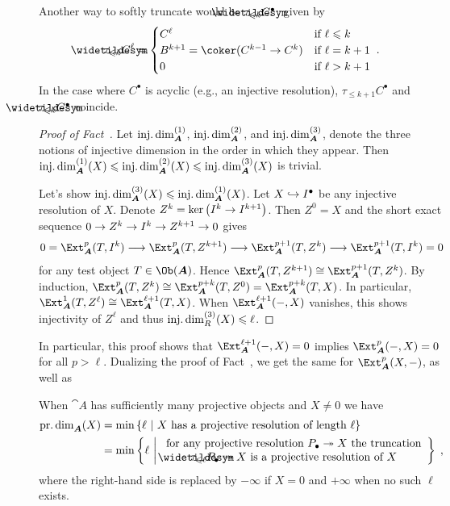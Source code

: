 \documentclass[a4paper,parskip=half,numbers=enddot, DIV=12]{scrreprt}
\renewcommand{\leq}{\leqslant}
\begin{document}
Another way to softly truncate would be $\snake{\tau}_{\leq k}C^\bullet$, given by
\begin{align*}
\snake{\tau}_{\leq k}C^\ell=\begin{cases}
C^\ell & \text{if }\ell\leq k\\
B^{k+1}=\coker(C^{k-1}\morphism C^k) & \text{if }\ell=k+1\\
0 & \text{if }\ell>k+1
\end{cases}\;.
\end{align*}
In the case where $C^\bullet$ is acyclic (e.g., an injective resolution), $\tau_{\leq k+1}C^\bullet$ and $\snake{\tau}_{\leq k}C^\bullet$ coincide.
\begin{proof}[Proof of Fact~]
	Let $\idim_{\cat A}^{(1)}$, $\idim_{\cat A}^{(2)}$, and $\idim_{\cat A}^{(3)}$,  denote the three notions of injective dimension in the order in which they appear. Then $\idim_{\cat A}^{(1)}(X)\leq \idim_{\cat A}^{(2)}(X)\leq \idim_{\cat A}^{(3)}(X)$ is trivial.
	
	Let's show $\idim_{\cat A}^{(3)}(X)\leq \idim_{\cat A}^{(1)}(X)$. Let $X\monomorphism I^\bullet$ be any injective resolution of $X$. Denote $Z^k=\ker\left(I^k\morphism I^{k+1}\right)$. Then $Z^0=X$ and the short exact sequence $0\morphism Z^k\morphism I^k\morphism Z^{k+1}\morphism 0$ gives
	\begin{align*}
		0=\Ext_{\cat A}^p(T,I^k)\morphism \Ext_{\cat A}^p(T,Z^{k+1})\morphism\Ext_{\cat A}^{p+1}(T,Z^k)\morphism\Ext_{\cat A}^{p+1}(T,I^k)=0
	\end{align*}
	for any test object $T\in\Ob({\cat A})$. Hence $\Ext_{\cat A}^p(T,Z^{k+1})\cong \Ext_{\cat A}^{p+1}(T,Z^k)$. By induction, $\Ext_{\cat A}^p(T,Z^k)\cong \Ext_{\cat A}^{p+k}(T,Z^0)=\Ext_{\cat A}^{p+k}(T,X)$. In particular, $\Ext_{\cat A}^1(T,Z^\ell)\cong \Ext_{\cat A}^{\ell+1}(T,X)$. When $\Ext_{\cat A}^{\ell+1}(-,X)$ vanishes, this shows injectivity of $Z^\ell$ and thus $\idim_R^{(3)}(X)\leq \ell$.
\end{proof}
In particular, this proof shows that $\Ext_{\cat A}^{\ell+1}(-,X)=0$ implies $\Ext_{\cat A}^p(-,X)=0$ for all $p>\ell$. Dualizing the proof of Fact~, we get the same for $\Ext_{\cat A}^p(X,-)$, as well as 
\begin{fact}
	When ${\cat A}$ has sufficiently many projective objects and $X\neq 0$ we have
	\begin{align*}
	\pdim_{\cat A}(X)&=\min\left\{\ell\st X\text{ has a projective resolution of length }\ell\right\}\\
	&=	\min\left\{\ell\st\begin{array}{c}
	\text{for any projective resolution }P_\bullet\epimorphism X\text{ the truncation}\\
	\snake{\tau}_{\leq\ell}P_\bullet\epimorphism X\text{ is a projective resolution of }X
	\end{array}
	\right\}\;,
	\end{align*}
	where the right-hand side is replaced by $-\infty$ if $X=0$ and $+\infty$ when no such $\ell$ exists.
\end{fact}
\end{document}
